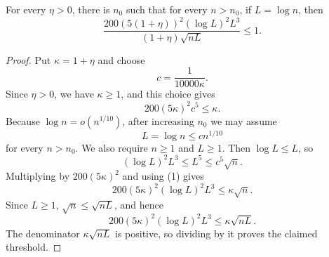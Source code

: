 \begin{helper}
For every \(\eta>0\), there is \(n_0\) such that for every \(n>n_0\), if
\(L=\log n\), then
\[
\frac{200(5(1+\eta))^2(\log L)^2L^3}
{(1+\eta)\sqrt{nL}}\le1.
\]
\end{helper}
\begin{proof}
Put \(\kappa=1+\eta\) and choose
\[
c=\frac1{10000\kappa}.
\]
Since \(\eta>0\), we have \(\kappa\ge1\), and this choice gives
\[
200(5\kappa)^2c^5\le\kappa. \tag{1}
\]
Because \(\log n=o(n^{1/10})\), after increasing \(n_0\) we may assume
\[
L=\log n\le c n^{1/10}
\]
for every \(n>n_0\).  We also require \(n\ge1\) and \(L\ge1\).  Then
\(\log L\le L\), so
\[
(\log L)^2L^3\le L^5\le c^5\sqrt n.
\]
Multiplying by \(200(5\kappa)^2\) and using (1) gives
\[
200(5\kappa)^2(\log L)^2L^3\le \kappa\sqrt n.
\]
Since \(L\ge1\), \(\sqrt n\le\sqrt{nL}\), and hence
\[
200(5\kappa)^2(\log L)^2L^3
\le \kappa\sqrt{nL}.
\]
The denominator \(\kappa\sqrt{nL}\) is positive, so dividing by it proves the
claimed threshold.
\end{proof}

